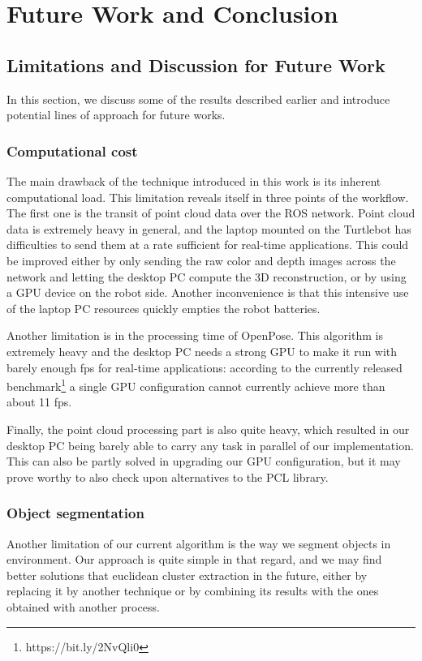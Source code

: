\chapter{Future Work and Conclusion}
\label{chap:conclusion}
\section{Limitations and Discussion for Future Work}
In this section, we discuss some of the results described earlier and introduce potential lines of approach for future works.

\subsection{Computational cost}
The main drawback of the technique introduced in this work is its inherent computational load. This limitation reveals itself in three points of the workflow. The first one is the transit of point cloud data over the ROS network. Point cloud data is extremely heavy in general, and the laptop mounted on the Turtlebot has difficulties to send them at a rate sufficient for real-time applications. This could be improved either by only sending the raw color and depth images across the network and letting the desktop PC compute the 3D reconstruction, or by using a GPU device on the robot side. Another inconvenience is that this intensive use of the laptop PC resources quickly empties the robot batteries. 

Another limitation is in the processing time of OpenPose. This algorithm is extremely heavy and the desktop PC needs a strong GPU to make it run with barely enough fps for real-time applications: according to the currently released benchmark\footnote{https://bit.ly/2NvQli0} a single GPU configuration cannot currently achieve more than about 11 fps.

Finally, the point cloud processing part is also quite heavy, which resulted in our desktop PC being barely able to carry any task in parallel of our implementation. This can also be partly solved in upgrading our GPU configuration, but it may prove worthy to also check upon alternatives to the PCL library.

\subsection{Object segmentation}
Another limitation of our current algorithm is the way we segment objects in environment. Our approach is quite simple in that regard, and we may find better solutions that euclidean cluster extraction in the future, either by replacing it by another technique or by combining its results with the ones obtained with another process. 

